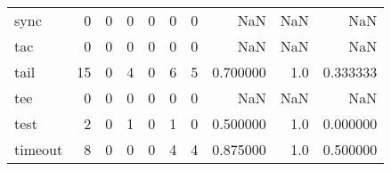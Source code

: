 \begin{tabular}{lrrrrrrrrr}
sync      &                                                  0 &                                                  0 &                                                  0 &                                                  0 &                                                  0 &                                                  0 &                                                NaN &                                    NaN &                                  NaN \\
tac       &                                                  0 &                                                  0 &                                                  0 &                                                  0 &                                                  0 &                                                  0 &                                                NaN &                                    NaN &                                  NaN \\
tail      &                                                 15 &                                                  0 &                                                  4 &                                                  0 &                                                  6 &                                                  5 &                                           0.700000 &                                    1.0 &                             0.333333 \\
tee       &                                                  0 &                                                  0 &                                                  0 &                                                  0 &                                                  0 &                                                  0 &                                                NaN &                                    NaN &                                  NaN \\
test      &                                                  2 &                                                  0 &                                                  1 &                                                  0 &                                                  1 &                                                  0 &                                           0.500000 &                                    1.0 &                             0.000000 \\
timeout   &                                                  8 &                                                  0 &                                                  0 &                                                  0 &                                                  4 &                                                  4 &                                           0.875000 &                                    1.0 &                             0.500000 \\

\end{tabular}
